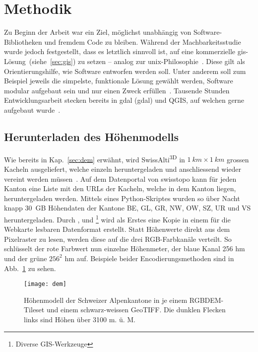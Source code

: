 \vfill

\pagebreak


\section{Methodik}

Zu Beginn der Arbeit war ein Ziel, möglichst unabhängig von Software-Bibliotheken und fremdem Code zu bleiben. Während der Machbarkeitsstudie wurde jedoch festgestellt, dass es letztlich sinnvoll ist, auf eine kommerzielle \acrshort{gis}-Lösung~(siehe~\ref{sec:gis}) zu setzen -- analog zur \acrshort{unix}-Philosophie~\cite{unixphil}. Diese gilt als Orientierungshilfe, wie Software entworfen werden soll. Unter anderem soll zum Beispiel jeweils die simpelste, funktionale Lösung gewählt werden, Software modular aufgebaut sein und nur einen Zweck erfüllen~\cite{unixphil}. Tausende Stunden Entwicklungsarbeit stecken bereits in \acrshort{gdal} (\acrlong{gdal}) und QGIS, auf welchen gerne aufgebaut wurde~\cite{gdalmanual}\cite{qgis}.
\subsection{Herunterladen des Höhenmodells}

Wie bereits in Kap.\ \ref{sec:dem} erwähnt, wird SwissAlti\textsuperscript{3D} in $\qty{1}{km} \times \qty{1}{km}$ grossen Kacheln ausgeliefert, welche einzeln heruntergeladen und anschliessend wieder vereint werden müssen~\cite{alti3dprod}. Auf dem Datenportal von swisstopo kann für jeden Kanton eine Liste mit den URLs der Kacheln, welche in dem Kanton liegen, heruntergeladen werden. Mittels eines Python-Skriptes wurden so über Nacht knapp \qty{30}{GB} Höhendaten der Kantone BE, GL, GR, NW, OW, SZ, UR und VS heruntergeladen. Durch ,  und \footnote{Diverse GIS-Werkzeuge} wird als Erstes eine Kopie in einem für die Webkarte lesbaren Datenformat erstellt. Statt Höhenwerte direkt aus dem Pixelraster zu lesen, werden diese auf die drei RGB-Farbkanäle verteilt. So schlüsselt der rote Farbwert nun einzelne Höhenmeter, der blaue Kanal 256 hm und der grüne $256^2$ hm auf. Beispiele beider Encodierungsmethoden sind in Abb.\ \ref{fig:dem} zu sehen.
\vfill

\begin{figure}[H]
  \centering
  \texttt{[image: dem]}
  \caption{Höhenmodell der Schweizer Alpenkantone in je einem RGBDEM-Tileset und einem schwarz-weissen GeoTIFF. Die dunklen Flecken links sind Höhen über 3100 m. ü. M.}\label{fig:dem}
\end{figure}
\vfill

